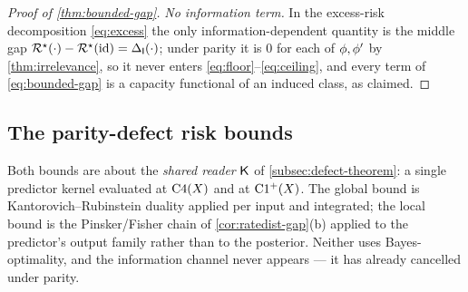 \begin{proof}[Proof of \cref{thm:bounded-gap}]
\emph{No information term.} In the excess-risk decomposition \eqref{eq:excess}
the only information-dependent quantity is the middle gap
$\mathcal{R}^{\star}(\cdot)-\mathcal{R}^{\star}(\mathrm{id})=\Delta_{\mathsf{I}}\!\left(\cdot\right)$; under parity it is
$0$ for each of $\phi,\phi'$ by \cref{thm:irrelevance}, so it never enters
\eqref{eq:floor}--\eqref{eq:ceiling}, and every term of \eqref{eq:bounded-gap}
is a capacity functional of an induced class, as claimed.
\end{proof}

\subsection{The parity-defect risk bounds}
\label{app:parity-defect}

Both bounds are about the \emph{shared reader} $\mathsf{K}$ of
\cref{subsec:defect-theorem}: a single predictor kernel evaluated at
$\mathrm{C}4(X)$ and at $\mathrm{C1^{+}}(X)$. The global bound is Kantorovich--Rubinstein
duality applied per input and integrated; the local bound is the Pinsker/Fisher
chain of \cref{cor:ratedist-gap}(b) applied to the predictor's output family
rather than to the posterior. Neither uses Bayes-optimality, and the
information channel never appears --- it has already cancelled under parity.

